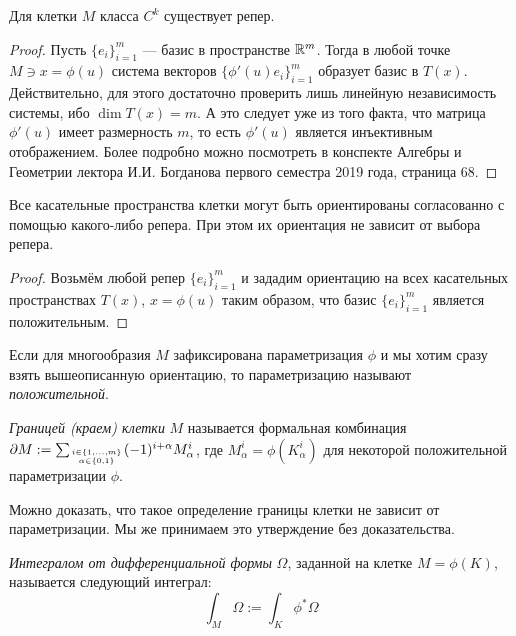 \begin{proposition}
	Для клетки $M$ класса $C^k$ существует репер.
\end{proposition}

\begin{proof}
	Пусть $\{e_i\}_{i = 1}^m$ --- базис в пространстве $\mathbb{R}^m$. Тогда в любой точке $M \ni x = \phi(u)$ система векторов $\{\phi'(u)e_i\}_{i = 1}^m$ образует базис в $T(x)$. Действительно, для этого достаточно проверить лишь линейную независимость системы, ибо $\dim T(x) = m$. А это следует уже из того факта, что матрица $\phi'(u)$ имеет размерность $m$, то есть $\phi'(u)$ является инъективным отображением. Более подробно можно посмотреть в конспекте Алгебры и Геометрии лектора И.И. Богданова первого семестра 2019 года, страница 68.
\end{proof}

\begin{proposition}
	Все касательные пространства клетки могут быть ориентированы согласованно с помощью какого-либо репера. При этом их ориентация не зависит от выбора репера.
\end{proposition}

\begin{proof}
	Возьмём любой репер $\{e_i\}_{i = 1}^m$ и зададим ориентацию на всех касательных пространствах $T(x)$, $x = \phi(u)$ таким образом, что базис $\{e_i\}_{i = 1}^m$ является положительным.
\end{proof}

\begin{note}
	Если для многообразия $M$ зафиксирована параметризация $\phi$ и мы хотим сразу взять вышеописанную ориентацию, то параметризацию называют \textit{положительной}.
\end{note}

\begin{definition}
	\textit{Границей (краем) клетки} $M$ называется формальная комбинация $\partial M := \sum_{i \in \{1, \ldots, m\} \atop {\alpha \in \{0, 1\}}} (-1)^{i + \alpha} M_\alpha^i$, где $M_\alpha^i = \phi(K_\alpha^i)$ для некоторой положительной параметризации $\phi$.
\end{definition}

\begin{note}
	Можно доказать, что такое определение границы клетки не зависит от параметризации. Мы же принимаем это утверждение без доказательства.
\end{note}

\begin{definition}
	\textit{Интегралом от дифференциальной формы} $\Omega$, заданной на клетке $M = \phi(K)$, называется следующий интеграл:
	\[
		\int_M \Omega := \int_K \phi^*\Omega
	\]
\end{definition}

